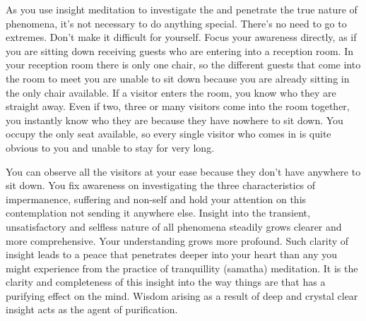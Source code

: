 As you use insight meditation to investigate the  and penetrate the true nature of phenomena, it's not necessary to do anything special. There's no need to go to extremes. Don't make it difficult for yourself. Focus your awareness directly, as if you are sitting down receiving guests who are entering into a reception room. In your reception room there is only one chair, so the different guests that come into the room to meet you are unable to sit down because you are already sitting in the only chair available. If a visitor enters the room, you know who they are straight away. Even if two, three or many visitors come into the room together, you instantly know who they are because they have nowhere to sit down. You occupy the only seat available, so every single visitor who comes in is quite obvious to you and unable to stay for very long. 

You can observe all the visitors at your ease because they don't have anywhere to sit down. You fix awareness on investigating the three characteristics of impermanence, suffering and non-self and hold your attention on this contemplation not sending it anywhere else. Insight into the transient, unsatisfactory and selfless nature of all phenomena steadily grows clearer and more comprehensive. Your understanding grows more profound. Such clarity of insight leads to a peace that penetrates deeper into your heart than any you might experience from the practice of tranquillity (samatha) meditation. It is the clarity and completeness of this insight into the way things are that has a purifying effect on the mind. Wisdom arising as a result of deep and crystal clear insight acts as the agent of purification. 

